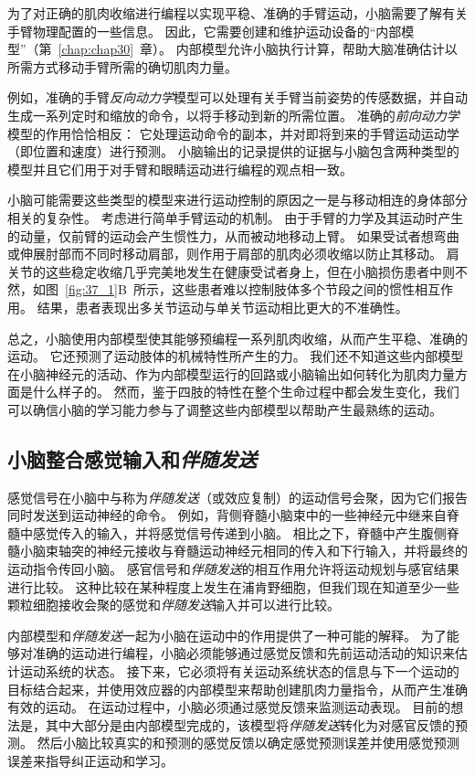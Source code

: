 为了对正确的肌肉收缩进行编程以实现平稳、准确的手臂运动，小脑需要了解有关手臂物理配置的一些信息。
因此，它需要创建和维护运动设备的“内部模型”（第~\ref{chap:chap30}~章）。
内部模型允许小脑执行计算，帮助大脑准确估计以所需方式移动手臂所需的确切肌肉力量。


例如，准确的手臂\textit{反向动力学}模型可以处理有关手臂当前姿势的传感数据，并自动生成一系列定时和缩放的命令，以将手移动到新的所需位置。
准确的\textit{前向动力学}模型的作用恰恰相反：
它处理运动命令的副本，并对即将到来的手臂运动运动学（即位置和速度）进行预测。
小脑输出的记录提供的证据与小脑包含两种类型的模型并且它们用于对手臂和眼睛运动进行编程的观点相一致。


小脑可能需要这些类型的模型来进行运动控制的原因之一是与移动相连的身体部分相关的复杂性。
考虑进行简单手臂运动的机制。
由于手臂的力学及其运动时产生的动量，仅前臂的运动会产生惯性力，从而被动地移动上臂。
如果受试者想弯曲或伸展肘部而不同时移动肩部，则作用于肩部的肌肉必须收缩以防止其移动。
肩关节的这些稳定收缩几乎完美地发生在健康受试者身上，但在小脑损伤患者中则不然，如图~\ref{fig:37_1}B~所示，这些患者难以控制肢体多个节段之间的惯性相互作用。
结果，患者表现出多关节运动与单关节运动相比更大的不准确性。


总之，小脑使用内部模型使其能够预编程一系列肌肉收缩，从而产生平稳、准确的运动。
它还预测了运动肢体的机械特性所产生的力。 我们还不知道这些内部模型在小脑神经元的活动、作为内部模型运行的回路或小脑输出如何转化为肌肉力量方面是什么样子的。
然而，鉴于四肢的特性在整个生命过程中都会发生变化，我们可以确信小脑的学习能力参与了调整这些内部模型以帮助产生最熟练的运动。



\subsection{小脑整合感觉输入和\textit{伴随发送}}

感觉信号在小脑中与称为\textit{伴随发送}（或效应复制）的运动信号会聚，因为它们报告同时发送到运动神经的命令。
例如，背侧脊髓小脑束中的一些神经元中继来自脊髓中感觉传入的输入，并将感觉信号传递到小脑。
相比之下，脊髓中产生腹侧脊髓小脑束轴突的神经元接收与脊髓运动神经元相同的传入和下行输入，并将最终的运动指令传回小脑。
感官信号和\textit{伴随发送}的相互作用允许将运动规划与感官结果进行比较。
这种比较在某种程度上发生在浦肯野细胞，但我们现在知道至少一些颗粒细胞接收会聚的感觉和\textit{伴随发送}输入并可以进行比较。


内部模型和\textit{伴随发送}一起为小脑在运动中的作用提供了一种可能的解释。
为了能够对准确的运动进行编程，小脑必须能够通过感觉反馈和先前运动活动的知识来估计运动系统的状态。
接下来，它必须将有关运动系统状态的信息与下一个运动的目标结合起来，并使用效应器的内部模型来帮助创建肌肉力量指令，从而产生准确有效的运动。
在运动过程中，小脑必须通过感觉反馈来监测运动表现。
目前的想法是，其中大部分是由内部模型完成的，该模型将\textit{伴随发送}转化为对感官反馈的预测。
然后小脑比较真实的和预测的感觉反馈以确定感觉预测误差并使用感觉预测误差来指导纠正运动和学习。


